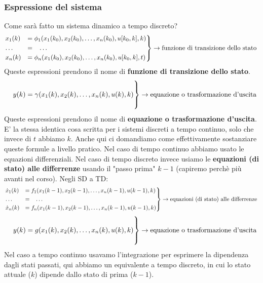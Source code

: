 \subsubsection{Espressione del sistema}
Come sarà fatto un sistema dinamico a tempo discreto?
\[
    \begin{rcases}
        x_1(k) &= \phi_1(x_1(k_0),x_2(k_0), \dots, x_n(k_0), u[k_0,k], k)\\
        \dots \;\;\;&= \;\;\;\dots\\
        x_n(k) &= \phi_n(x_1(k_0),x_2(k_0), \dots, x_n(k_0), u[k_0,k], t)
    \end{rcases} \rightarrow \text{funzione di transizione dello stato}\;
\]
Queste espressioni prendono il nome di \textbf{funzione di transizione dello stato}.\newline
\[
    \begin{rcases}
        \\
        \;\;\;\; y(k) = \gamma(x_1(k),x_2(k), \dots, x_n(k), u(k), k)\\
        \\
    \end{rcases} \rightarrow \text{equazione o trasformazione d'uscita}\;
\]
Queste espressioni prendono il nome di \textbf{equazione o trasformazione d'uscita}.\newline
\newline
E' la stessa identica cosa scritta per i sistemi discreti a tempo continuo, solo che invece di $t$ abbiamo $k$.\newline
\newline
Anche qui ci domandiamo come effettivamente sostanziare queste formule a livello pratico. Nel caso di tempo continuo abbiamo usato le equazioni differenziali. Nel caso di tempo discreto invece usiamo le \textbf{equazioni (di stato) alle differrenze} usando il "passo prima" $k-1$ (capiremo perchè più avanti nel corso).\newline
\newline
Negli SD a TD: 
\[
    \begin{rcases}
        \dot{x}_1(k) &= f_1(x_1(k-1),x_2(k-1), \dots, x_n(k-1), u(k-1), k)\\
        \dots \;\;\;&= \;\;\;\dots\\
        \dot{x}_n(k) &= f_n(x_1(k-1),x_2(k-1), \dots, x_n(k-1), u(k-1), k)
    \end{rcases} \rightarrow \text{equazioni (di stato) alle differrenze}\;
\]
\[
    \begin{rcases}
        \\
        \;\;\;\; y(k) = g(x_1(k),x_2(k), \dots, x_n(k), u(k), k)\\
        \\
    \end{rcases} \rightarrow \text{equazione o trasformazione d'uscita}\;
\]
Nel caso a tempo continuo usavamo l'integrazione per esprimere la dipendenza dagli stati passati, qui abbiamo un equivalente a tempo discreto, in cui lo stato attuale ($k$) dipende dallo stato di prima ($k-1$).
